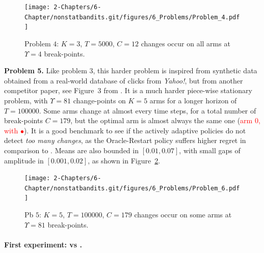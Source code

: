 \begin{figure}[h!]  %
    \centering
    \texttt{[image: 2-Chapters/6-Chapter/nonstatbandits.git/figures/6\_Problems/Problem\_4.pdf]}
    \caption{Problem $4$: $K=3$, $T=5000$, $C=12$ changes occur on all arms at $\Upsilon=4$ break-points.}
    \label{fig:6:Problem_4}
\end{figure}


\textbf{Problem 5.}
%
Like problem $3$, this harder problem is inspired from synthetic data obtained from a real-world database of clicks from \emph{Yahoo!}, but from another competitor paper, see Figure~3 from \cite{LiuLeeShroff17}.
%
It is a much harder piece-wise stationary problem, with $\Upsilon=81$ change-points on $K=5$ arms for a longer horizon of $T=100000$.
Some arms change at almost every time steps, for a total number of break-points $C=179$, but the optimal arm is almost always the same one (\textcolor{red}{arm $0$, with $\bullet$}).
It is a good benchmark to see if the actively adaptive policies do not detect \emph{too many changes}, as the Oracle-Restart policy suffers higher regret in comparison to \klUCB.
Means are also bounded in $[0.01, 0.07]$, with small gaps of amplitude in $[0.001, 0.02]$,
as shown in Figure~\ref{fig:6:Problem_6}.

\begin{figure}[h!]  %
    \centering
    \texttt{[image: 2-Chapters/6-Chapter/nonstatbandits.git/figures/6\_Problems/Problem\_6.pdf]}
    \caption{Pb $5$: $K=5$, $T=100000$, $C=179$ changes occur on some arms at $\Upsilon=81$ break-points.}
    \label{fig:6:Problem_6}
\end{figure}





\paragraph{First experiment: \UCB{} vs \klUCB{}.}
%

